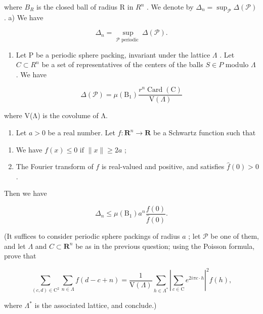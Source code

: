 where \(B_{R}\) is the closed ball of radius R in \(R^{n}\) . We denote by \(\Delta_{n} = \sup_{\mathcal{P}} \Delta(\mathcal{P})\) . a) We have

\[
\Delta_ {n} = \sup _ {\mathcal {P} \text {   periodic }} \Delta (\mathcal {P}).
\]

\begin{enumerate}
\def\labelenumi{\alph{enumi})}
\setcounter{enumi}{1}
\tightlist
\item
  Let P be a periodic sphere packing, invariant under the lattice \(\Lambda\) . Let \(C \subset R^{n}\) be a set of representatives of the centers of the balls \(S \in P\) modulo \(\Lambda\) . We have
\end{enumerate}

\[
\Delta (\mathcal {P}) = \mu (\mathrm{B} _ {1}) \frac {r ^ {n} \operatorname{Card} (\mathrm{C})}{\mathrm{V} (\Lambda)}
\]

where V(Λ) is the covolume of Λ.

\begin{enumerate}
\def\labelenumi{\alph{enumi})}
\setcounter{enumi}{2}
\tightlist
\item
  Let \(a > 0\) be a real number. Let \(f: \mathbf{R}^{n} \to \mathbf{R}\) be a Schwartz function such that
\end{enumerate}

\begin{enumerate}
\def\labelenumi{(\roman{enumi})}
\item
  We have \(f(x) \leqslant 0 \text{ if } \|x\| \geqslant 2a\) ;
\item
  The Fourier transform of \(f\) is real-valued and positive, and satisfies \(\widehat{f}(0)>0\) .
\end{enumerate}

Then we have

\[
\Delta_ {n} \leqslant \mu (\mathrm{B} _ {1}) a ^ {n} \frac {f (0)}{\widehat {f} (0)}.
\]

(It suffices to consider periodic sphere packings of radius \(a\) ; let \(\mathcal{P}\) be one of them, and let \(\Lambda\) and \(C \subset \mathbf{R}^n\) be as in the previous question; using the Poisson formula, prove that

\[
\sum_ {(c, d) \in \mathrm{C} ^ {2}} \sum_ {n \in \Lambda} f (d - c + n) = \frac {1}{\mathrm{V} (\Lambda)} \sum_ {h \in \Lambda^ {*}} \left| \sum_ {c \in \mathrm{C}} e ^ {2 i \pi c \cdot h} \right| ^ {2} \widehat {f} (h),
\]

where \(\Lambda^{*}\) is the associated lattice, and conclude.)

